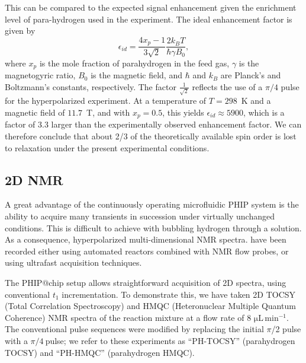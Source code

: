 This can be compared to the expected signal enhancement given the enrichment
level of para-hydrogen used in the experiment. The ideal enhancement factor is
given by
\begin{equation}
	\epsilon_{id} =\frac{4x_p-1}{3\sqrt{2}} \frac{2 k_BT}{\hbar \gamma B_0},
\end{equation}
where $x_p$ is the mole fraction of parahydrogen in the feed gas, $\gamma$ is
the magnetogyric ratio, $B_0$ is the magnetic field, and $\hbar$ and $k_B$ are
Planck's and Boltzmann's constants, respectively.
The factor $\frac{1}{\sqrt{2}}$ reflects the use of a $\pi/4$ pulse for the
hyperpolarized experiment. At a temperature of $T=298$~K
and a magnetic field of $11.7$~T, and with $x_p=0.5$, this yields
$\epsilon_{id}\approx 5900$, which is a factor of 3.3 larger than the
experimentally observed enhancement factor. We can therefore conclude that
about 2/3 of the theoretically available spin order is lost to relaxation under
the present experimental conditions.

\subsection{2D NMR}

A great advantage of the continuously operating microfluidic PHIP system is the
ability to acquire many transients in succession under virtually unchanged
conditions.
This is difficult to achieve with bubbling hydrogen through a solution.
As a consequence, hyperpolarized multi-dimensional NMR spectra\cite{Mishkovsky:2008cl,Giraudeau:2009fn,Roth:2010hk,Lloyd:2012cf,Eshuis:2015ce,Kiryutin:2019hy}. have been recorded
either using automated reactors combined with NMR flow probes,\cite{Lloyd:2012cf,Eshuis:2015ce}
or using ultrafast acquisition techniques\cite{Mishkovsky:2008cl,Giraudeau:2009fn,Kiryutin:2019hy}.

The PHIP@chip setup allows straightforward acquisition of 2D spectra, using
conventional $t_1$ incrementation.
To demonstrate this, we have taken 2D TOCSY (Total Correlation
Spectroscopy) and HMQC (Heteronuclear Multiple Quantum Coherence) NMR spectra
of the reaction mixture at a flow rate of 8 $\mathrm{\mu L\,min^{-1}}$.
The conventional
pulse sequences were modified by replacing the initial \(\pi\)/2 pulse with a
\(\pi/4\ \)pulse; we refer to these experiments as ``PH-TOCSY'' (parahydrogen TOCSY) and
``PH-HMQC'' (parahydrogen HMQC).

